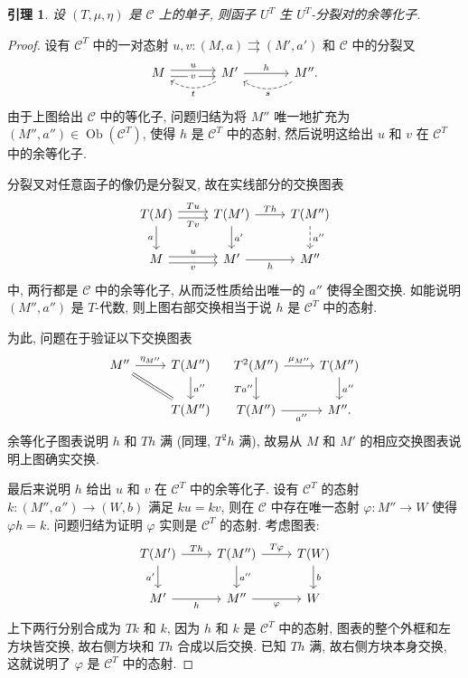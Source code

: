 \documentclass[11pt]{article}
\newcommand{\Obj}{\operatorname{Ob}}
\newcommand{\CorpusNumber}{0}
\newtheorem{lemma}[theorem]{引理}
\theoremstyle{definition}
\begin{document}
\def\CorpusNumber{7.6.12}
\begin{lemma}\label{prop:UT-split-fork}
	设 $(T, \mu, \eta)$ 是 $\mathcal{C}$ 上的单子, 则函子 $U^T$ 生 $U^T$-分裂对的余等化子.
\end{lemma}
\begin{proof}
	设有 $\mathcal{C}^T$ 中的一对态射 $u, v: (M, a) \rightrightarrows (M', a')$ 和 $\mathcal{C}$ 中的分裂叉
	\begin{equation*}\begin{tikzcd}[column sep=large]
		M \arrow[shift left, r, "u"] \arrow[shift right, r, "v" description] & M' \arrow[r, "h"] \arrow[dashed, l, bend left, "t"] & M'' \arrow[dashed, l, bend left, "s"].
	\end{tikzcd}\end{equation*}
	由于上图给出 $\mathcal{C}$ 中的等化子, 问题归结为将 $M''$ 唯一地扩充为 $(M'', a'') \in \Obj(\mathcal{C}^T)$, 使得 $h$ 是 $\mathcal{C}^T$ 中的态射, 然后说明这给出 $u$ 和 $v$ 在 $\mathcal{C}^T$ 中的余等化子.
	
	分裂叉对任意函子的像仍是分裂叉, 故在实线部分的交换图表
	\[\begin{tikzcd}
		T(M) \arrow[shift left, r, "Tu"] \arrow[shift right, r, "Tv"'] \arrow[d, "a"'] & T(M') \arrow[r, "Th"] \arrow[d, "{a'}"] & T(M'') \arrow[dashed, d, "{a''}"] \\
		M \arrow[shift left, r, "u"] \arrow[shift right, r, "v"'] & M' \arrow[r, "h"'] & M''
	\end{tikzcd}\]
	中, 两行都是 $\mathcal{C}$ 中的余等化子, 从而泛性质给出唯一的 $a''$ 使得全图交换. 如能说明 $(M'', a'')$ 是 $T$-代数, 则上图右部交换相当于说 $h$ 是 $\mathcal{C}^T$ 中的态射.
	
	为此, 问题在于验证以下交换图表
	\[\begin{tikzcd}
		M'' \arrow[r, "{\eta_{M''}}"] \arrow[equal, rd] & T(M'') \arrow[d, "{a''}"] \\
		& T(M'')
	\end{tikzcd} \quad
	\begin{tikzcd}
		T^2(M'') \arrow[r, "{\mu_{M''}}"] \arrow[d, "{Ta''}"'] & T(M'') \arrow[d, "{a''}"] \\
		T(M'') \arrow[r, "{a''}"'] & M'' .
	\end{tikzcd}\]
	余等化子图表说明 $h$ 和 $Th$ 满 (同理, $T^2 h$ 满), 故易从 $M$ 和 $M'$ 的相应交换图表说明上图确实交换.
	
	最后来说明 $h$ 给出 $u$ 和 $v$ 在 $\mathcal{C}^T$ 中的余等化子. 设有 $\mathcal{C}^T$ 的态射 $k: (M'', a'') \to (W, b)$ 满足 $ku = kv$, 则在 $\mathcal{C}$ 中存在唯一态射 $\varphi: M'' \to W$ 使得 $\varphi h = k$. 问题归结为证明 $\varphi$ 实则是 $\mathcal{C}^T$ 的态射. 考虑图表:
	\[\begin{tikzcd}
		T(M') \arrow[r, "Th"] \arrow[d, "{a'}"'] & T(M'') \arrow[r, "T\varphi"] \arrow[d, "{a''}"] & T(W) \arrow[d, "b"] \\
		M' \arrow[r, "h"'] & M'' \arrow[r, "\varphi"'] & W
	\end{tikzcd}\]
	上下两行分别合成为 $Tk$ 和 $k$, 因为 $h$ 和 $k$ 是 $\mathcal{C}^T$ 中的态射, 图表的整个外框和左方块皆交换, 故右侧方块和 $Th$ 合成以后交换. 已知 $Th$ 满, 故右侧方块本身交换, 这就说明了 $\varphi$ 是 $\mathcal{C}^T$ 中的态射.
\end{proof}
\end{document}
